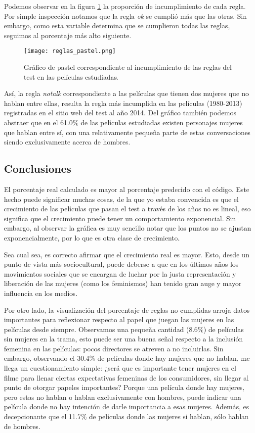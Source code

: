 \documentclass{article}
\begin{document}
Podemos observar en la figura \ref{fig:pastel} la proporción de incumplimiento de cada regla. Por simple inspección notamos que la regla \textit{ok} se cumplió más que las otras. Sin embargo, como esta variable determina que se cumplieron todas las reglas, seguimos al porcentaje más alto siguiente.

\begin{figure}[h!]
\centering
\texttt{[image: reglas\_pastel.png]}
\caption{\label{fig:pastel}Gráfico de pastel correspondiente al incumplimiento de las reglas del test en las películas estudiadas.}
\end{figure}

Así, la regla \textit{notalk} correspondiente a las películas que tienen dos mujeres que no hablan entre ellas, resulta la regla más incumplida en las películas (1980-2013) registradas en el sitio web del test al año 2014. Del gráfico también podemos abstraer que en el 61.0\% de las películas estudiadas existen personajes mujeres que hablan entre sí, con una relativamente pequeña parte de estas conversaciones siendo exclusivamente acerca de hombres.

\subsection{Conclusiones}
El porcentaje real calculado es mayor al porcentaje predecido con el código. Este hecho puede significar muchas cosas, de la que yo estaba convencida es que el crecimiento de las películas que pasan el test a través de los años no es lineal, eso significa que el crecimiento puede tener un comportamiento exponencial.
Sin embargo, al observar la gráfica es muy sencillo notar que los puntos no se ajustan exponencialmente, por lo que es otra clase de crecimiento.

Sea cual sea, es correcto afirmar que el crecimiento real es mayor. Esto, desde un punto de vista más sociocultural, puede deberse a que en los últimos años los movimientos sociales que se encargan de luchar por la justa representación y liberación de las mujeres (como los feminismos) han tenido gran auge y mayor influencia en los medios. 

Por otro lado, la visualización del porcentaje de reglas no cumplidas arroja datos importantes para reflexionar respecto al papel que juegan las mujeres en las películas desde siempre. Observamos una pequeña cantidad (8.6\%) de películas sin mujeres en la trama, esto puede ser una buena señal respecto a la inclusión femenina en las películas: pocos directores se atreven a no incluirlas. Sin embargo, observando el 30.4\% de películas donde hay mujeres que no hablan, me llega un cuestionamiento simple: ¿será que es importante tener mujeres en el filme para llenar ciertas expectativas femeninas de los consumidores, sin llegar al punto de otorgar papeles importantes? Porque una película donde hay mujeres, pero estas no hablan o hablan exclusivamente con hombres, puede indicar una película donde no hay intención de darle importancia a esas mujeres. Además, es decepcionante que el 11.7\% de películas donde las mujeres si hablan, sólo hablan de hombres.
\end{document}
